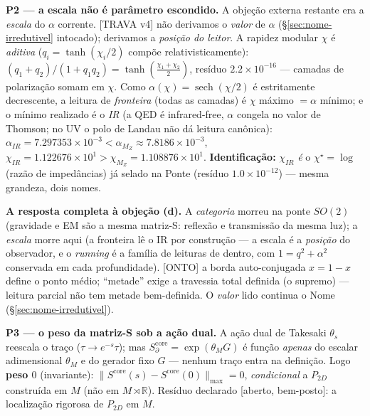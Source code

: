 \documentclass[11pt]{article}
\theoremstyle{definition}\newtheorem{deriv}{Derivação}
\begin{document}
\textbf{P2 --- a escala não é parâmetro escondido.} A objeção externa restante era a \emph{escala} do $\alpha$ corrente. \textsf{[TRAVA v4]} não derivamos o \emph{valor} de $\alpha$ (\S\ref{sec:nome-irredutivel} intocado); derivamos a \emph{posição do leitor}. A rapidez modular $\chi$ é \emph{aditiva} ($q_i=\tanh(\chi_i/2)$ compõe relativisticamente): $(q_1+q_2)/(1+q_1q_2)=\tanh(\tfrac{\chi_1+\chi_2}2)$, resíduo $2.2\times10^{-16}$ --- camadas de polarização somam em $\chi$. Como $\alpha(\chi)=\operatorname{sech}(\chi/2)$ é estritamente decrescente, a leitura de \emph{fronteira} (todas as camadas) é $\chi$ máximo $=\alpha$ mínimo; e o mínimo realizado é o \emph{IR} (a QED é infrared-free, $\alpha$ congela no valor de Thomson; no UV o polo de Landau não dá leitura canônica): $\alpha_{IR}=7.297353\times10^{-3}<\alpha_{M_Z}\approx7.8186\times10^{-3}$, $\chi_{IR}=1.122676\times10^{1}>\chi_{M_Z}=1.108876\times10^{1}$. \textbf{Identificação:} $\chi_{IR}$ \emph{é} o $\chi^\star=\log$(razão de impedâncias) já selado na Ponte (resíduo $1.0\times10^{-12}$) --- mesma grandeza, dois nomes.

\textbf{A resposta completa à objeção (d).} A \emph{categoria} morreu na ponte $SO(2)$ (gravidade e EM são a mesma matriz-S: reflexão e transmissão da mesma luz); a \emph{escala} morre aqui (a fronteira lê o IR por construção --- a escala é a \emph{posição} do observador, e o \emph{running} é a família de leituras de dentro, com $1=q^2+\alpha^2$ conservada em cada profundidade). \textsf{[ONTO]} a borda auto-conjugada $x=1-x$ define o ponto médio; ``metade'' exige a travessia total definida (o supremo) --- leitura parcial não tem metade bem-definida. O \emph{valor} lido continua o Nome (\S\ref{sec:nome-irredutivel}).

\textbf{P3 --- o peso da matriz-S sob a ação dual.} A ação dual de Takesaki $\theta_s$ reescala o traço ($\tau\to e^{-s}\tau$); mas $S_\partial^{\mathrm{core}}=\exp(\theta_M G)$ é função \emph{apenas} do escalar adimensional $\theta_M$ e do gerador fixo $G$ --- nenhum traço entra na definição. Logo \textbf{peso $0$} (invariante): $\|S^{\mathrm{core}}(s)-S^{\mathrm{core}}(0)\|_{\max}=0$, \emph{condicional} a $P_{2D}$ construída em $M$ (não em $M\rtimes\mathbb R$). Resíduo declarado [aberto, bem-posto]: a localização rigorosa de $P_{2D}$ em $M$.
\end{document}
